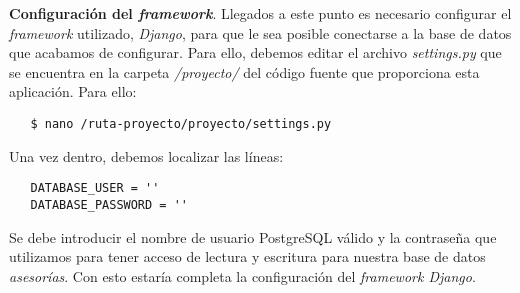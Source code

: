 \item \textbf{Configuración del \textit{framework}}.
   Llegados a este punto es necesario configurar el \textit{framework}
   utilizado, \textit{Django}, para que le sea posible conectarse a la base de
   datos que acabamos de configurar. Para ello, debemos editar el archivo
   \textit{settings.py} que se encuentra en la carpeta \textit{/proyecto/} del
   código fuente que proporciona esta aplicación. Para ello:

   \begin{verbatim}
   $ nano /ruta-proyecto/proyecto/settings.py
   \end{verbatim}

   Una vez dentro, debemos localizar las líneas:

   \begin{verbatim}
   DATABASE_USER = ''
   DATABASE_PASSWORD = ''
   \end{verbatim}

   Se debe introducir el nombre de usuario PostgreSQL válido y la contraseña
   que utilizamos para tener acceso de lectura y escritura para nuestra base
   de datos \textit{asesorías}. Con esto estaría completa la configuración
   del \textit{framework Django}.

